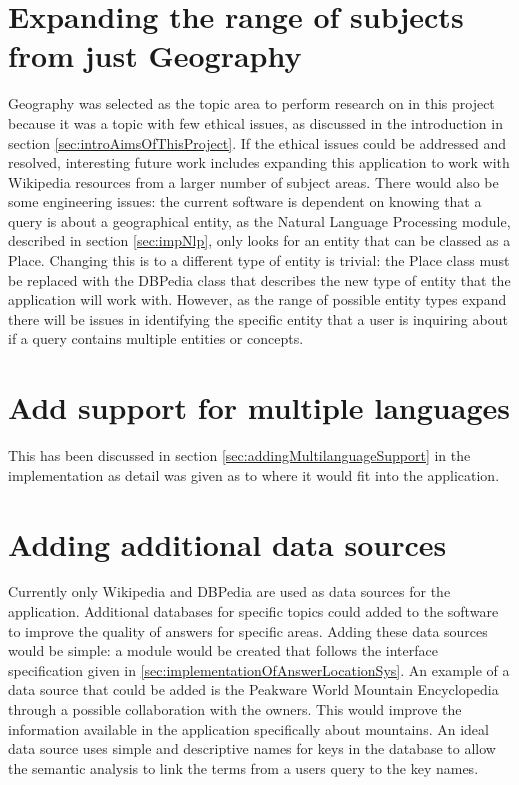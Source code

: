 \documentclass[authoryearcitations]{UoYCSproject}
\begin{document}
\section{Expanding the range of subjects from just Geography}
\label{sec:evalExpandingSubjects}
Geography was selected as the topic area to perform research on in this project because it was a topic with few ethical issues, as discussed in the introduction in section \ref{sec:introAimsOfThisProject}. If the ethical issues could be addressed and resolved, interesting future work includes expanding this application to work with Wikipedia resources from a larger number of subject areas. There would also be some engineering issues: the current software is dependent on knowing that a query is about a geographical entity, as the Natural Language Processing module, described in section \ref{sec:impNlp}, only looks for an entity that can be classed as a Place. Changing this is to a different type of entity is trivial: the Place class must be replaced with the DBPedia class that describes the new type of entity that the application will work with. However, as the range of possible entity types expand there will be issues in identifying the specific entity that a user is inquiring about if a query contains multiple entities or concepts.

\section{Add support for multiple languages}
\label{sec:evalMultipleLanguages}
This has been discussed in section \ref{sec:addingMultilanguageSupport} in the implementation as detail was given as to where it would fit into the application. 

\section{Adding additional data sources}
\label{sec:evalAdditionalSources}
Currently only Wikipedia and DBPedia are used as data sources for the application. Additional databases for specific topics could added to the software to improve the quality of answers for specific areas. Adding these data sources would be simple: a module would be created that follows the interface specification given in \ref{sec:implementationOfAnswerLocationSys}. An example of a data source that could be added is the Peakware World Mountain Encyclopedia~\cite{peakware} through a possible collaboration with the owners. This would improve the information available in the application specifically about mountains. An ideal data source uses simple and descriptive names for keys in the database to allow the semantic analysis to link the terms from a users query to the key names.
\end{document}
